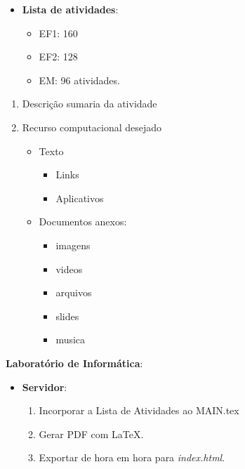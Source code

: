 {\begin{multicols}{2}
\begin{itemize}
\large	\item \textbf{Lista de atividades}:
\begin{itemize}
	\item EF1: 160 
	\item EF2: 128
	\item EM: 96 atividades.
\end{itemize}
\end{itemize}

\vfill\null
\columnbreak

\Large
	\begin{enumerate}
		\item Descrição sumaria da atividade
		\item Recurso computacional desejado
\begin{itemize}
		\item Texto
\begin{itemize}
	\large \item Links
	\item Aplicativos
\end{itemize}
	\item Documentos anexos:
	\begin{itemize}
		\large \item imagens
		\item videos
		\item arquivos
		\item slides
		\item musica
	\end{itemize} 
\end{itemize}
	\end{enumerate}

\vfill\null
\columnbreak

\Large
	\textbf{Laboratório de Informática}:

\begin{itemize}
	\Large
	\item \textbf{Servidor}:
	\Large 	\begin{enumerate}
\item Incorporar a Lista de Atividades ao MAIN.tex
		\item Gerar PDF com \LaTeX.
		\item Exportar de hora em hora para \textit{index.html}.
	\end{enumerate}

\vfill\null
\columnbreak


\end{itemize}
\end{multicols}}
